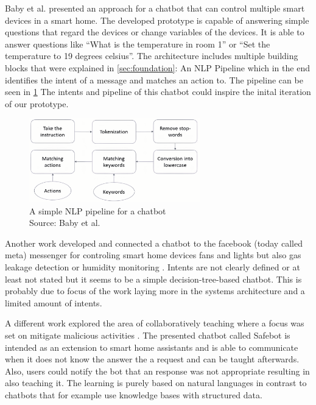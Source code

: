 Baby et al. \cite{baby_home_2017} presented an approach for a chatbot that can control multiple smart devices in a smart home.
The developed prototype is capable of answering simple questions that regard the devices or change variables of the devices.
It is able to answer questions like ``What is the temperature in room 1'' or ``Set the temperature to 19 degrees celsius''.
The architecture includes multiple building blocks that were explained in \cref{sec:foundation}: An NLP Pipeline which in the end identifies the intent of a message and matches an action to.
The pipeline can be seen in \cref{fig:chatbot-pipeline-baby}
The intents and pipeline of this chatbot could inspire the inital iteration of our prototype. 
\begin{figure}[h]
\centering
\includegraphics[width=0.66\textwidth]{graphics/baby2017chatbot.png}
\caption{A simple NLP pipeline for a chatbot \\Source: Baby et al. \cite{baby_home_2017}}
\label{fig:chatbot-pipeline-baby}
\end{figure}

Another work developed and connected a chatbot to the facebook (today called meta) messenger for controling smart home devices fans and lights but also gas leakage detection or humidity monitoring \cite{ahmed_smart_2020}.
Intents are not clearly defined or at least not stated but it seems to be a simple decision-tree-based chatbot.
This is probably due to focus of the work laying more in the systems architecture and a limited amount of intents.

A different work explored the area of collaboratively teaching where a focus was set on mitigate malicious activities \cite{chkroun_safe_2021}.
The presented chatbot called Safebot is intended as an extension to smart home assistants and is able to communicate when it does not know the answer the a request and can be taught afterwards.
Also, users could notify the bot that an response was not appropriate resulting in also teaching it.
The learning is purely based on natural languages in contrast to chatbots that for example use knowledge bases with structured data.

